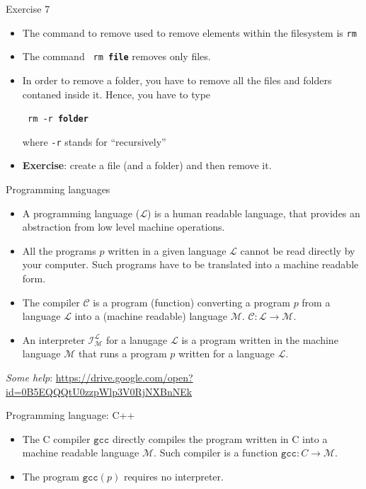 \documentclass{beamer}
\begin{document}
\begin{frame}{Exercise 7}
	\begin{itemize}
		\item The command to remove used to remove elements within the filesystem is \texttt{rm}
		\item The command  \texttt{\color{green} rm \textbf{\color{blue} file}} removes only files.
		\item In order to remove a folder, you have to remove all the files and folders contaned inside it. Hence, you have to type  \begin{center}
			\texttt{\color{green} rm -r \textbf{\color{blue} folder}}
		\end{center} where \texttt{-r} stands for ``recursively''
		\item \textbf{Exercise}: create a file (and a folder) and then remove it.
	\end{itemize}
\end{frame}


\begin{frame}{Programming languages}
	\begin{itemize}
		\item A programming language ($\mathcal{L}$) is a human readable language, that provides an abstraction from low level machine operations.
		\item All the programs $p$ written in a given language $\mathcal{L}$ cannot be read directly by your computer. Such programs have to be translated into a machine readable form.
		\item The compiler $\mathcal{C}$ is a program (function) converting a program $p$ from a language $\mathcal{L}$ into a (machine readable) language $\mathcal{M}$. $\mathcal{C}\colon \mathcal{L}\to \mathcal{M}$.
		\item An interpreter $\mathcal{I}_{\mathcal{M}}^{\mathcal{L}}$ for a lanugage $\mathcal{L}$ is a program written in the machine language $\mathcal{M}$ that runs a program $p$ written for a language $\mathcal{L}$.
	\end{itemize}
\begin{center}
\textit{Some help}: \url{https://drive.google.com/open?id=0B5EQQQtU0zzpWlp3V0RjNXBnNEk}
\end{center}
\end{frame}

\begin{frame}{Programming language: C++}
	\begin{itemize}
		\item The C compiler $\texttt{gcc}$ directly compiles the program written in C into a machine readable language $\mathcal{M}$. Such compiler is a function $\texttt{gcc}\colon C\to \mathcal{M}$.
		\item The program $\texttt{gcc}(p)$ requires no interpreter.
	\end{itemize}
\end{frame}
\end{document}
